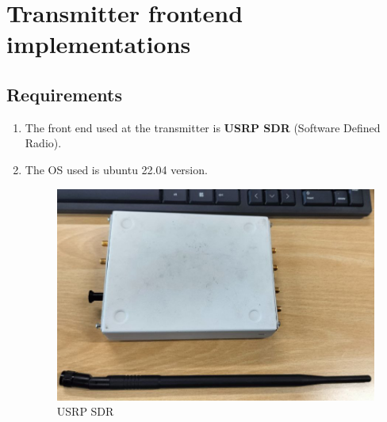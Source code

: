\section{Transmitter frontend implementations}

\subsection{Requirements}
\begin{enumerate}
    \item The front end used at the transmitter is \textbf{USRP SDR} (Software Defined Radio).
    \item The OS used is ubuntu 22.04 version.
    \begin{normalsize}
    \begin{figure}[ht]
        \centering
        \includegraphics[width=1\textwidth]{figs/usrp.png}
        \centering
        \captionsetup{justification=centering}
        \caption{USRP SDR}
        \end{figure}
    \end{normalsize}
\end{enumerate}
